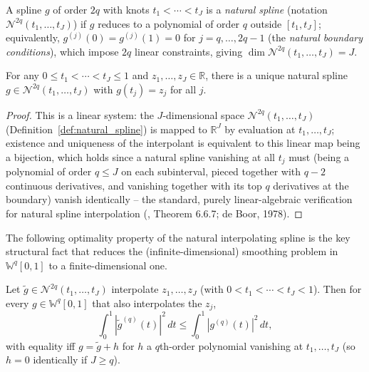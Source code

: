 \begin{definition}
\label{def:natural_spline}
A spline $g$ of order $2q$ with knots $t_1<\cdots<t_J$ is a \emph{natural
spline} (notation $\mathcal{N}^{2q}(t_1,\dots,t_J)$) if $g$ reduces to a
polynomial of order $q$ outside $[t_1,t_J]$; equivalently, $g^{(j)}(0)=
g^{(j)}(1)=0$ for $j=q,\dots,2q-1$ (the \emph{natural boundary
conditions}), which impose $2q$ linear constraints, giving
$\dim\mathcal{N}^{2q}(t_1,\dots,t_J) = J$.
\end{definition}

\begin{theorem}
\label{thm:natural_spline_interp}
For any $0\leq t_1<\cdots<t_J\leq 1$ and $z_1,\dots,z_J\in\mathbb{R}$,
there is a unique natural spline $g\in\mathcal{N}^{2q}(t_1,\dots,t_J)$ with
$g(t_j)=z_j$ for all $j$.
\end{theorem}

\begin{proof}
This is a linear system: the $J$-dimensional space $\mathcal{N}^{2q}
(t_1,\dots,t_J)$ (Definition~\ref{def:natural_spline}) is mapped to
$\mathbb{R}^J$ by evaluation at $t_1,\dots,t_J$; existence and uniqueness
of the interpolant is equivalent to this linear map being a bijection,
which holds since a natural spline vanishing at all $t_j$ must (being a
polynomial of order $q\leq J$ on each subinterval, pieced together with
$q-2$ continuous derivatives, and vanishing together with its top $q$
derivatives at the boundary) vanish identically -- the standard, purely
linear-algebraic verification for natural spline interpolation
(\cite{hsingeubank2015}, Theorem 6.6.7; de Boor, 1978).
\end{proof}

The following optimality property of the natural interpolating spline is
the key structural fact that reduces the (infinite-dimensional) smoothing
problem in $\mathbb{W}^q[0,1]$ to a finite-dimensional one.

\begin{theorem}
\label{thm:natural_spline_optimal}
Let $\widetilde{g}\in\mathcal{N}^{2q}(t_1,\dots,t_J)$ interpolate
$z_1,\dots,z_J$ (with $0<t_1<\cdots<t_J<1$). Then for every $g\in
\mathbb{W}^q[0,1]$ that also interpolates the $z_j$,
\begin{equation}
\int_0^1|\widetilde{g}^{(q)}(t)|^2\,dt \leq \int_0^1|g^{(q)}(t)|^2\,dt,
\label{eq:natural_spline_optimal}
\end{equation}
with equality iff $g=\widetilde{g}+h$ for $h$ a $q$th-order polynomial
vanishing at $t_1,\dots,t_J$ (so $h=0$ identically if $J\geq q$).
\end{theorem}

